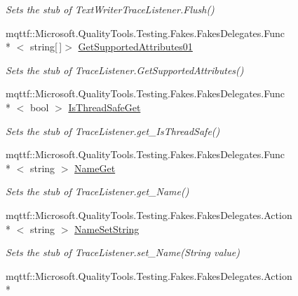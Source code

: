 \begin{DoxyCompactItemize}
\begin{DoxyCompactList}\small\item\em Sets the stub of Text\-Writer\-Trace\-Listener.\-Flush()\end{DoxyCompactList}\item 
mqttf\-::\-Microsoft.\-Quality\-Tools.\-Testing.\-Fakes.\-Fakes\-Delegates.\-Func\\*
$<$ string\mbox{[}$\,$\mbox{]}$>$ \hyperlink{class_system_1_1_diagnostics_1_1_fakes_1_1_stub_text_writer_trace_listener_aaeb3555a8f897d2f7e944cb183112574}{Get\-Supported\-Attributes01}
\begin{DoxyCompactList}\small\item\em Sets the stub of Trace\-Listener.\-Get\-Supported\-Attributes()\end{DoxyCompactList}\item 
mqttf\-::\-Microsoft.\-Quality\-Tools.\-Testing.\-Fakes.\-Fakes\-Delegates.\-Func\\*
$<$ bool $>$ \hyperlink{class_system_1_1_diagnostics_1_1_fakes_1_1_stub_text_writer_trace_listener_aa380c91c47a13ffedf0cf12d36e9f828}{Is\-Thread\-Safe\-Get}
\begin{DoxyCompactList}\small\item\em Sets the stub of Trace\-Listener.\-get\-\_\-\-Is\-Thread\-Safe()\end{DoxyCompactList}\item 
mqttf\-::\-Microsoft.\-Quality\-Tools.\-Testing.\-Fakes.\-Fakes\-Delegates.\-Func\\*
$<$ string $>$ \hyperlink{class_system_1_1_diagnostics_1_1_fakes_1_1_stub_text_writer_trace_listener_a7f3406cd363d8081f8368ea74a93fd87}{Name\-Get}
\begin{DoxyCompactList}\small\item\em Sets the stub of Trace\-Listener.\-get\-\_\-\-Name()\end{DoxyCompactList}\item 
mqttf\-::\-Microsoft.\-Quality\-Tools.\-Testing.\-Fakes.\-Fakes\-Delegates.\-Action\\*
$<$ string $>$ \hyperlink{class_system_1_1_diagnostics_1_1_fakes_1_1_stub_text_writer_trace_listener_a1c79f9d2181e42c36b756a017c86f941}{Name\-Set\-String}
\begin{DoxyCompactList}\small\item\em Sets the stub of Trace\-Listener.\-set\-\_\-\-Name(\-String value)\end{DoxyCompactList}\item 
mqttf\-::\-Microsoft.\-Quality\-Tools.\-Testing.\-Fakes.\-Fakes\-Delegates.\-Action\\*

\end{DoxyCompactItemize}
